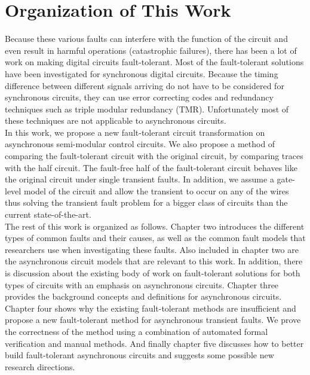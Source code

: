 \documentclass[12pt]{report}
\begin{document}
\section{Organization of This Work}
Because these various faults can interfere with the function of the circuit and even result in harmful operations (catastrophic failures), there has been a lot of work on making digital circuits fault-tolerant. Most of the fault-tolerant solutions have been investigated for synchronous digital circuits.  Because the timing difference between different signals arriving do not have to be considered for synchronous circuits, they can use error correcting codes and redundancy techniques such as triple modular redundancy (TMR). Unfortunately most of these techniques are not applicable to asynchronous circuits.\\

In this work, we propose a new fault-tolerant circuit transformation on asynchronous semi-modular control circuits.  We also propose a method of comparing the fault-tolerant circuit with the original circuit, by comparing traces with the half circuit.  The fault-free half of the fault-tolerant circuit behaves like the original circuit under single transient faults.  In addition, we assume a gate-level model of the circuit and allow the transient to occur on any of the wires thus solving the transient fault problem for a bigger class of circuits than the current state-of-the-art.\\

The rest of this work is organized as follows.  Chapter two introduces the different types of common faults and their causes, as well as the common fault models that researchers use when investigating these faults.  Also included in chapter two are the asynchronous circuit models that are relevant to this work.  In addition, there is discussion about the existing body of work on fault-tolerant solutions for both types of circuits with an emphasis on asynchronous circuits.  Chapter three provides the background concepts and definitions for asynchronous circuits.  Chapter four shows why the existing fault-tolerant methods are insufficient and propose a new fault-tolerant method for asynchronous transient faults.  We prove the correctness of the method using a combination of automated formal verification and manual methods.  And finally chapter five discusses how to better build fault-tolerant asynchronous circuits and suggests some possible new research directions.
\end{document}
